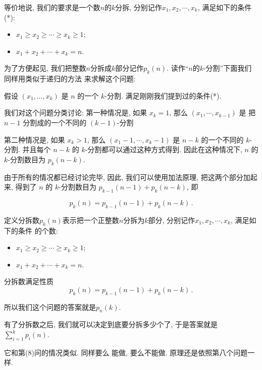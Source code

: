 等价地说, 我们的要求是一个数$n$的$k$分拆, 分别记作$x_1, x_2, \cdots, x_k$, 满足如下的条件(*): 
\begin{itemize}[noitemsep]
  \item  $x_1\ge x_2\ge\cdots\ge x_k\ge 1$;
  \item $x_1+x_2+\cdots+x_k=n$.
\end{itemize}

为了方便起见, 我们把整数$n$分拆成$k$部分记作$p_k(n)$. 读作``$n$的$k$-分割''下面我们同样用类似于递归的方法
来求解这个问题: 

假设 \((x_1,\ldots,x_k)\) 是 \(n\) 的一个 \(k\)-分割. 满足刚刚我们提到过的条件(*).

我们对这个问题分类讨论: 第一种情况是, 如果 \(x_k = 1\),
那么 \((x_1,\cdots,x_{k-1})\) 是 把\(n-1\) 分割成的一个不同的 \((k-1)\)-分割

第二种情况是, 如果 \(x_k > 1\), 那么 \((x_1-1,\cdots,x_{k}-1)\) 是 \(n-k\) 
的一个不同的 \(k\)-分割. 并且每个 \(n-k\) 的 \(k\)-分割都可以通过这种方式得到. 
因此在这种情况下, \(n\) 的 \(k\)-分割数目为 \(p_k(n-k)\). 

由于所有的情况都已经讨论完毕, 因此, 我们可以使用加法原理, 把这两个部分加起来, 得到了
\(n\) 的 \(k\)-分割数目为 \(p_{k-1}(n-1) + p_k(n-k)\), 即

\[p_k(n)=p_{k-1}(n-1)+p_k(n-k)\,.\]

\begin{definition}[分拆数]
  定义分拆数$p_k(n)$表示把一个正整数$n$分拆为$k$部分, 分别记作$x_1, x_2, \cdots, x_k$, 满足如下的条件
  的个数: 
  \begin{itemize}[noitemsep]
    \item  $x_1\ge x_2\ge\cdots\ge x_k\ge 1$;
    \item $x_1+x_2+\cdots+x_k=n$.
  \end{itemize}
\end{definition}

\begin{theorem}
  分拆数满足性质
  $$p_k(n)=p_{k-1}(n-1)+p_k(n-k)\,.$$
\end{theorem}

所以我们这个问题的答案就是$p_n(k)$. 

有了分拆数之后, 我们就可以决定到底要分拆多少个了,  于是答案就是$\sum_{i=1}^{k}p_i(n)$. 

 它和第(8)问的情况类似. 同样要么
能做, 要么不能做. 原理还是依照第八个问题一样. 

